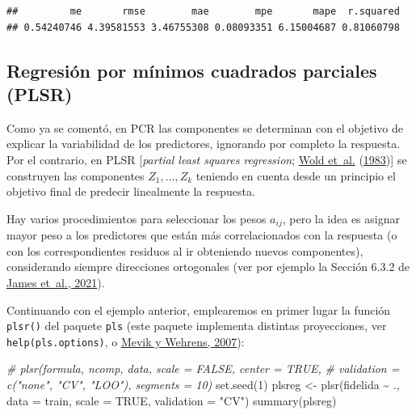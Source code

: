 \documentclass[
  spanish,
]{book}
\newenvironment{Shaded}{\begin{snugshade}}{\end{snugshade}}
\newcommand{\AttributeTok}[1]{\textcolor[rgb]{0.77,0.63,0.00}{#1}}
\newcommand{\CommentTok}[1]{\textcolor[rgb]{0.56,0.35,0.01}{\textit{#1}}}
\newcommand{\ConstantTok}[1]{\textcolor[rgb]{0.00,0.00,0.00}{#1}}
\newcommand{\DecValTok}[1]{\textcolor[rgb]{0.00,0.00,0.81}{#1}}
\newcommand{\FunctionTok}[1]{\textcolor[rgb]{0.00,0.00,0.00}{#1}}
\newcommand{\NormalTok}[1]{#1}
\newcommand{\OtherTok}[1]{\textcolor[rgb]{0.56,0.35,0.01}{#1}}
\newcommand{\SpecialCharTok}[1]{\textcolor[rgb]{0.00,0.00,0.00}{#1}}
\newcommand{\StringTok}[1]{\textcolor[rgb]{0.31,0.60,0.02}{#1}}
\theoremstyle{break}
\theoremstyle{definition}
\theoremstyle{definition}
\theoremstyle{definition}
\theoremstyle{definition}
\theoremstyle{remark}
\begin{document}
\begin{verbatim}
##         me       rmse        mae        mpe       mape  r.squared 
## 0.54240746 4.39581553 3.46755308 0.08093351 6.15004687 0.81060798
\end{verbatim}

\hypertarget{regresiuxf3n-por-muxednimos-cuadrados-parciales-plsr}{%
\subsection{Regresión por mínimos cuadrados parciales (PLSR)}\label{regresiuxf3n-por-muxednimos-cuadrados-parciales-plsr}}

Como ya se comentó, en PCR las componentes se determinan con el objetivo de explicar la variabilidad de los predictores, ignorando por completo la respuesta.
Por el contrario, en PLSR {[}\emph{partial least squares regression}; \protect\hyperlink{ref-wold1983multivariate}{Wold et~al.} (\protect\hyperlink{ref-wold1983multivariate}{1983}){]} se construyen las componentes \(Z_1, \ldots, Z_k\) teniendo en cuenta desde un principio el objetivo final de predecir linealmente la respuesta.

Hay varios procedimientos para seleccionar los pesos \(a_{ij}\), pero la idea es asignar mayor peso a los predictores que están más correlacionados con la respuesta (o con los correspondientes residuos al ir obteniendo nuevos componentes), considerando siempre direcciones ortogonales (ver por ejemplo la Sección 6.3.2 de \protect\hyperlink{ref-james2021introduction}{James et~al., 2021}).

Continuando con el ejemplo anterior, emplearemos en primer lugar la función \texttt{plsr()} del paquete \texttt{pls} (este paquete implementa distintas proyecciones, ver \texttt{help(pls.options)}, o \protect\hyperlink{ref-Mevik2007pls}{Mevik y Wehrens, 2007}):

\begin{Shaded}
\begin{Highlighting}[]
\CommentTok{\# plsr(formula, ncomp, data, scale = FALSE, center = TRUE, }
\CommentTok{\#      validation = c("none", "CV", "LOO"), segments = 10)}
\FunctionTok{set.seed}\NormalTok{(}\DecValTok{1}\NormalTok{)}
\NormalTok{plsreg }\OtherTok{\textless{}{-}} \FunctionTok{plsr}\NormalTok{(fidelida }\SpecialCharTok{\textasciitilde{}}\NormalTok{ ., }\AttributeTok{data =}\NormalTok{ train, }\AttributeTok{scale =} \ConstantTok{TRUE}\NormalTok{, }\AttributeTok{validation =} \StringTok{"CV"}\NormalTok{)}
\FunctionTok{summary}\NormalTok{(plsreg)}
\end{Highlighting}
\end{Shaded}
\end{document}
